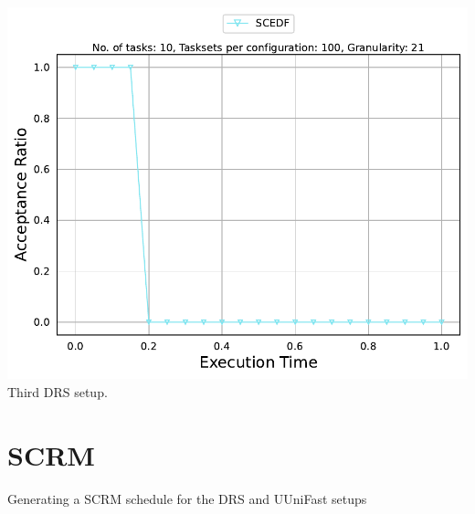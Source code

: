 \documentclass[]{article}
\begin{document}
\begin{minipage}[t]{0.48\linewidth}
            \includegraphics[width=\linewidth]{SCEDF_3rd Setup.pdf}
		Third DRS setup.
		\vspace{0.3cm}


                   

	\end{minipage}

        \clearpage

        \section{SCRM}
{
\raggedleft Generating a SCRM schedule for the DRS and UUniFast setups \newline
}
\end{document}
